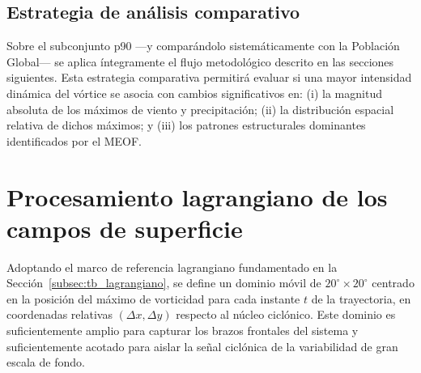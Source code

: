 

\subsection{Estrategia de análisis comparativo}\label{subsec:estrategia_analise}

Sobre el subconjunto p90 —y comparándolo sistemáticamente con la Población Global— se aplica íntegramente el flujo metodológico descrito en las secciones siguientes. Esta estrategia comparativa permitirá evaluar si una mayor intensidad dinámica del vórtice se asocia con cambios significativos en: (i) la magnitud absoluta de los máximos de viento y precipitación; (ii) la distribución espacial relativa de dichos máximos; y (iii) los patrones estructurales dominantes identificados por el MEOF.


\section{Procesamiento lagrangiano de los campos de superficie}\label{sec:procesamiento_lagrangiano}

Adoptando el marco de referencia lagrangiano fundamentado en la Sección~\ref{subsec:tb_lagrangiano}, se define un dominio móvil de $20^{\circ} \times 20^{\circ}$ centrado en la posición del máximo de vorticidad para cada instante $t$ de la trayectoria, en coordenadas relativas $(\Delta x, \Delta y)$ respecto al núcleo ciclónico. Este dominio es suficientemente amplio para capturar los brazos frontales del sistema y suficientemente acotado para aislar la señal ciclónica de la variabilidad de gran escala de fondo.

